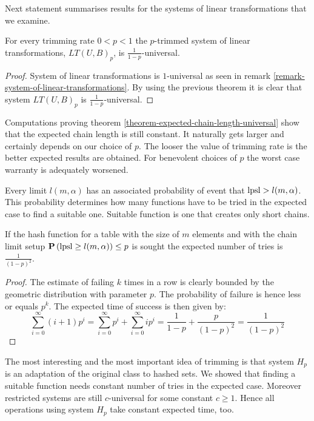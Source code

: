 Next statement summarises results for the systems of linear transformations that we examine.

\begin{corollary}
\label{corollary-trimming-linear}
For every trimming rate $0 < p < 1$ the $p$-trimmed system of linear transformations, $LT(U, B)_p$, is $\frac{1}{1 - p}$-universal.
\end{corollary}
\begin{proof}
System of linear transformations is $1$-universal as seen in remark \ref{remark-system-of-linear-transformations}. By using the previous theorem it is clear that system $LT(U, B)_p$ is $\frac{1}{1 - p}$-universal.
\end{proof}

Computations proving theorem \ref{theorem-expected-chain-length-universal} show that the expected chain length is still constant. It naturally gets larger and certainly depends on our choice of $p$. The looser the value of trimming rate is the better expected results are obtained. For benevolent choices of $p$ the worst case warranty is adequately worsened.

Every limit $l(m, \alpha)$ has an associated probability of event that $\mathrm{lpsl} > l(m, \alpha)$. This probability determines how many functions have to be tried in the expected case to find a suitable one. Suitable function is one that creates only short chains.

\begin{lemma}
\label{lemma-linear-transformations-tries}
If the hash function for a table with the size of $m$ elements and with the chain limit setup $\mathbf{P}\left(\mathrm{lpsl} \geq l(m, \alpha)\right) \leq p$ is sought the expected number of tries is $\frac{1}{(1 - p)^2}$.
\end{lemma}
\begin{proof}
The estimate of failing $k$ times in a row is clearly bounded by the geometric distribution with parameter $p$. The probability of failure is hence less or equals $p^k$. The expected time of success is then given by:
\[
\sum_{i = 0}^{\infty} (i + 1)p^i = \sum_{i = 0}^{\infty}p^i + \sum_{i = 0}^{\infty}ip^i = \frac{1}{1 - p} + \frac{p}{(1- p)^2} = \frac{1}{(1 - p)^2}
\]
\end{proof}

The most interesting and the most important idea of trimming is that system $H_p$ is an adaptation of the original class to hashed sets. We showed that finding a suitable function needs constant number of tries in the expected case. Moreover restricted systems are still $c$-universal for some constant $c \geq 1$. Hence all operations using system $H_p$ take constant expected time, too.

